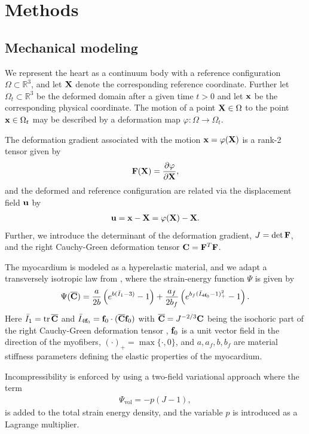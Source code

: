 \section{Methods}


\subsection{Mechanical modeling}
\label{paper4:sec:mechanical_modeling}
We represent the heart as a continuum body with a reference configuration 
$\Omega \subset \mathbb{R}^3$, and let $\mathbf{X}$ denote the
corresponding reference coordinate. Further let $ \Omega_t
\subset \mathbb{R}^3$ be the deformed domain after a given time $t >
0$ and let $\mathbf{x}$ be the corresponding physical coordinate.  The
motion of a point $\mathbf{X} \in  \Omega$ to the  point $\mathbf{x} \in
\Omega_t$ may be described by a deformation map  $\varphi :
\Omega  \rightarrow \Omega_t$. 

The deformation gradient associated with the motion $\mathbf{x} =
\varphi(\mathbf{X})$ is a rank-2 tensor given by 
\begin{align}
\mathbf{F}(\mathbf{X}) = \frac{\partial \varphi}{\partial \mathbf{X}},
\end{align}
and the deformed and reference configuration are related via the
displacement field  $\mathbf{u}$ by 
\begin{align}  
\mathbf{u} = \mathbf{x}-\mathbf{X} = \varphi( \mathbf{X}) -\mathbf{X}.
\end{align}
Further, we introduce the determinant of the deformation gradient, $J =
\det \mathbf{F}$, and the right Cauchy-Green deformation tensor $\mathbf{C} = \mathbf{F}^T \mathbf{F}$.

The myocardium is modeled as a hyperelastic material, and we adapt a
transversely isotropic law from \cite{holzapfel2009constitutive},
where the strain-energy function $\Psi$ is given by  
\begin{align}
  \label{paper4:eq:hoa}
  \Psi(\overline{\mathbf{C}}) = \frac{a}{2 b} \left( e^{ b (\bar{I}_1  - 3)}  -1 \right)
  + \frac{a_f}{2 b_f} \left( e^{ b_f (\bar{I}_{4\mathbf{f}_0} - 1)_+^2} -1 \right). 
\end{align}
Here $\bar{I}_1 = \mathrm{tr} \hspace{0.05cm} \overline{\mathbf{C}}$ and $\bar{I}_{4\mathbf{f}_0}= \mathbf{f}_0 \cdot (\overline{\mathbf{C}}
\mathbf{f}_0)$ with $\overline{\mathbf{C}} = J^{-2/3}\mathbf{C}$ being the isochoric part of the right
Cauchy-Green deformation tensor , $\mathbf{f}_0$ is a
unit vector field in the direction of the myofibers, $(\cdotp)_{+} 
= \max\{\cdot, 0\}$, and $a, a_f, b, b_f$ are 
material stiffness parameters defining the elastic properties of the
myocardium.

Incompressibility is enforced by using a two-field variational approach
where the term
\begin{align}
\Psi_{\text{vol}} = - p (J-1), 
\end{align}
is added to the total strain energy density, and the variable $p$ is
introduced as a Lagrange multiplier.

